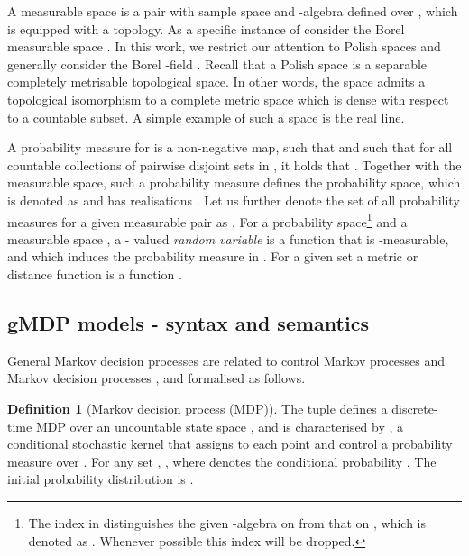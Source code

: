 \documentclass[letterpaper, 10 pt, conference]{amsart}
\theoremstyle{definition}
\newtheorem{defn}[definition]{Definition}
\theoremstyle{example}
\theoremstyle{remark}
\begin{document}
A measurable space is a pair  with sample space  and -algebra  defined over , 
which is equipped with a topology.    
As a specific instance of  consider the Borel measurable space . 
In this work, we restrict our attention to Polish spaces and generally consider the Borel -field \cite{bogachev2007measure}. 
Recall that a Polish space is a separable completely metrisable topological space. 
In other words, 
the space admits a topological isomorphism to a complete metric space which is dense with respect to a countable subset. 
A simple example of such a space is the real line.  

A probability measure  for  is a non-negative map, 
 such that  and such that for all countable collections  of pairwise disjoint sets in , 
it holds that  
.   
Together with the measurable space, such a probability measure  defines the probability space, which is denoted as  and has realisations  .   
Let us further denote the set of all probability measures for a given measurable pair  as .  
\setcounter{footnote}{0} 
For a probability space\footnote{The index  in  distinguishes the given -algebra on  from that on , which is denoted as . 
Whenever possible this index will be dropped.}   and a measurable space , a - valued \emph{random variable}  is a function  that is -measurable, 
 and which induces the probability measure  in .  
For a given set  a metric or distance function  is a function . 

\subsection{gMDP models - syntax and semantics}
General Markov decision processes are related to control Markov processes \cite{Abate2011} and Markov decision processes \cite{bible,mt1993,hll1996}, 
and formalised as follows.  
\begin{defn}[Markov decision process (MDP)] \label{def:MDP}
The tuple  defines a discrete-time MDP over an uncountable state space , and is characterised by , a conditional stochastic kernel that assigns to each point  and control  a probability measure  over . For any set , , where  denotes the conditional probability . The initial probability distribution is . 
\end{defn}
\end{document}
